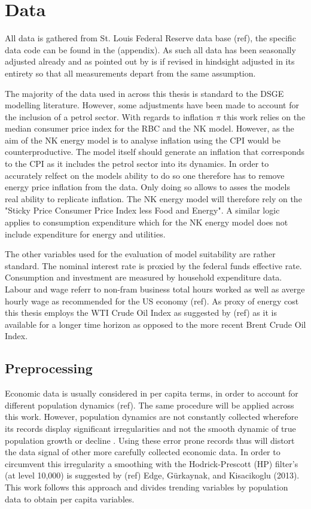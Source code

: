 \documentclass[12pt,a4paper,english]{article} %
\let\oldsection\section
\renewcommand\section{\clearpage\oldsection}
\begin{document}
	

	
	\section{Data}
	
	All data is gathered from St. Louis Federal Reserve data base (ref), the specific data code can be found in the (appendix). As such all data has been seasonally adjusted already and as pointed out by \cite{pfeifer_guide_2021} is if revised in hindsight adjusted in its entirety so that all measurements depart from the same assumption.
	
	The majority of the data used in across this thesis is standard to the DSGE modelling literature. However, some adjustments have been made to account for the inclusion of a petrol sector.
	With regards to inflation $\pi$ this work relies on the median consumer price index for the RBC and the NK model. However, as the aim of the NK energy model is to analyse inflation using the CPI would be counterproductive. The model itself should generate an inflation that corresponds to the CPI as it includes the petrol sector into its dynamics. In order to accurately relfect on the models ability to do so one therefore has to remove energy price inflation from the data. Only doing so allows to asses the models real ability to replicate inflation. The NK energy model will therefore rely on the "Sticky Price Consumer Price Index less Food and Energy". A similar logic applies to consumption expenditure which for the NK energy model does not include expenditure for energy and utilities.
	
	The other variables used for the evaluation of model suitability are rather standard. The nominal interest rate is proxied by the federal funds effective rate. Consumption and investment are measured by household expenditure data. Labour and wage referr to non-fram business total hours worked as well as averge hourly wage as recommended for the US economy (ref). As proxy of energy cost this thesis employs the WTI Crude Oil Index as suggested by (ref) as it is available for a longer time horizon as opposed to the more recent Brent Crude Oil Index.
	
	\subsection{Preprocessing}
	
	Economic data is usually considered in per capita terms, in order to account for different population dynamics (ref). The same procedure will be applied across this work. However, population dynamics are not constantly collected wherefore its records display significant irregularities and not the smooth dynamic of true population growth or decline \cite{pfeifer_guide_2021}. Using these error prone records thus will distort the data signal of other more carefully collected economic data. In order to circumvent this irregularity a smoothing with the Hodrick-Prescott (HP) filter's (at level 10,000) is suggested by (ref) Edge, Gürkaynak, and Kisacikoglu (2013). This work follows this approach and divides trending variables by population data to obtain per capita variables.
	
\end{document}
